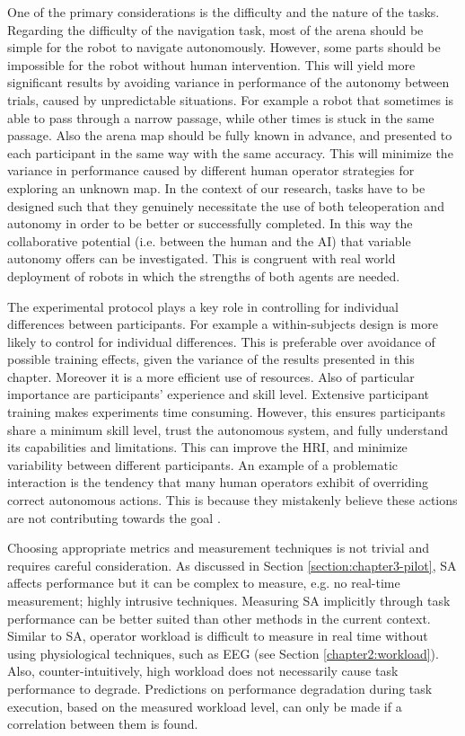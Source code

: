 \documentclass[a4paper,12pt,oneside,openright]{bhamthesis}
\begin{document}
One of the primary considerations is the difficulty and the nature of the tasks. Regarding the difficulty of the navigation task, most of the arena should be simple for the robot to navigate autonomously. However, some parts should be impossible for the robot without human intervention. This will yield more significant results by avoiding variance in performance of the autonomy between trials, caused by unpredictable situations. For example a robot that sometimes is able to pass through a narrow passage, while other times is stuck in the same passage. Also the arena map should be fully known in advance, and presented to each participant in the same way with the same accuracy. This will minimize the variance in performance caused by different human operator strategies for exploring an unknown map. In the context of our research, tasks have to be designed such that they genuinely necessitate the use of both teleoperation and autonomy in order to be better or successfully completed. In this way the collaborative potential (i.e. between the human and the AI) that variable autonomy offers can be investigated. This is congruent with real world deployment of robots in which the strengths of both agents are needed.

The experimental protocol plays a key role in controlling for individual differences between participants. For example a within-subjects design is more likely to control for individual differences. This is preferable over avoidance of possible training effects, given the variance of the results presented in this chapter. Moreover it is a more efficient use of resources. Also of particular importance are participants' experience and skill level. Extensive participant training makes experiments time consuming. However, this ensures participants share a minimum skill level, trust the autonomous system, and fully understand its capabilities and limitations. This can improve the HRI, and minimize variability between different participants. An example of a problematic interaction is the tendency that many human operators exhibit of overriding correct autonomous actions. This is because they mistakenly believe these actions are not contributing towards the goal \cite{Marble2004}.

Choosing appropriate metrics and measurement techniques is not trivial and requires careful consideration. As discussed in Section \ref{section:chapter3-pilot}, SA affects performance but it can be complex to measure, e.g. no real-time measurement; highly intrusive techniques. Measuring SA implicitly through task performance can be better suited than other methods in the current context. Similar to SA, operator workload is difficult to measure in real time without using physiological techniques, such as EEG (see Section \ref{chapter2:workload}). Also, counter-intuitively, high workload does not necessarily cause task performance to degrade. Predictions on performance degradation during task execution, based on the measured workload level, can only be made if a correlation between them is found.
\end{document}
